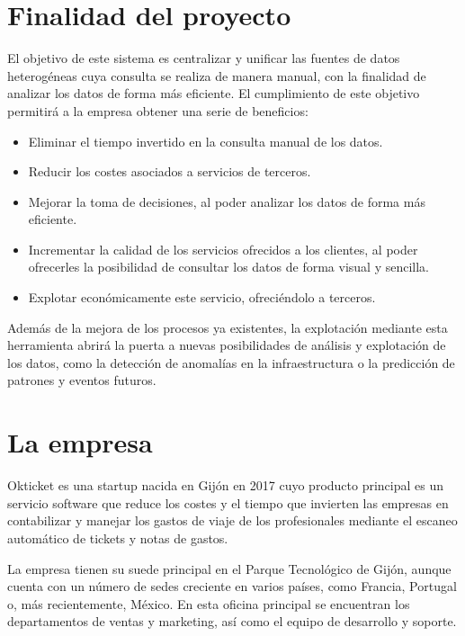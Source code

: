 \section{Finalidad del proyecto}\label{sec:finalidad}
El objetivo de este sistema es centralizar y unificar las fuentes de datos heterogéneas
cuya consulta se realiza de manera manual, con la finalidad de analizar los datos de forma
más eficiente. El cumplimiento de este objetivo permitirá a la empresa obtener una serie de
beneficios:
\begin{itemize}
	\item Eliminar el tiempo invertido en la consulta manual de los datos.
	\item Reducir los costes asociados a servicios de terceros.
	\item Mejorar la toma de decisiones, al poder analizar los datos de forma más eficiente.
	\item Incrementar la calidad de los servicios ofrecidos a los clientes, al poder ofrecerles
	      la posibilidad de consultar los datos de forma visual y sencilla.
	\item Explotar económicamente este servicio, ofreciéndolo a terceros.
\end{itemize}

Además de la mejora de los procesos ya existentes, la explotación mediante esta herramienta
abrirá la puerta a nuevas posibilidades de análisis y explotación de los datos, como la detección
de anomalías en la infraestructura o la predicción de patrones y eventos futuros.

\section{La empresa}\label{sec:empresa}
Okticket es una startup nacida en Gijón en 2017 cuyo producto principal es un servicio software
que reduce los costes y el tiempo que invierten las empresas en contabilizar y manejar los gastos
de viaje de los profesionales mediante el escaneo automático de tickets y notas de gastos.

La empresa tienen su suede principal  en el Parque Tecnológico de Gijón, aunque cuenta con un número
de sedes creciente en varios países, como Francia, Portugal o, más recientemente, México. En esta
oficina principal se encuentran los departamentos de ventas y marketing, así como el equipo de
desarrollo y soporte.

